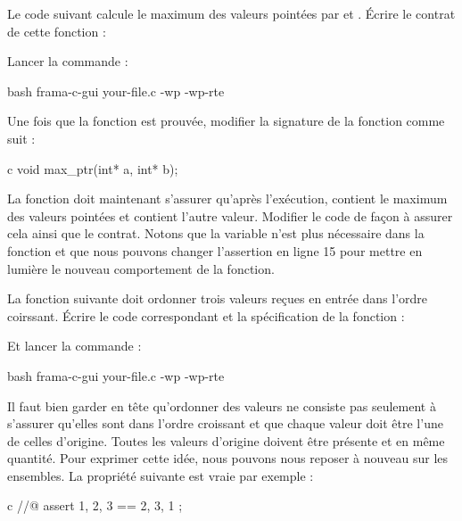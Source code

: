 

Le code suivant calcule le maximum des valeurs pointées par 
et . Écrire le contrat de cette fonction :




Lancer la commande :


\begin{CodeBlock}{bash}
frama-c-gui your-file.c -wp -wp-rte
\end{CodeBlock}


Une fois que la fonction est prouvée, modifier la signature de la
fonction comme suit :


\begin{CodeBlock}{c}
void max_ptr(int* a, int* b);
\end{CodeBlock}


La fonction doit maintenant s'assurer qu'après l'exécution, 
contient le maximum des valeurs pointées et  contient l'autre
valeur. Modifier le code de façon à assurer cela ainsi que le contrat.
Notons que la variable   n'est plus nécessaire dans la fonction
 et que nous pouvons changer l'assertion en ligne 15 pour
mettre en lumière le nouveau comportement de la fonction.




La fonction suivante doit ordonner trois valeurs reçues en entrée dans
l'ordre coirssant. Écrire le code correspondant et la spécification de la
fonction :



Et lancer la commande :


\begin{CodeBlock}{bash}
frama-c-gui your-file.c -wp -wp-rte
\end{CodeBlock}


Il faut bien garder en tête qu'ordonner des valeurs ne consiste pas seulement
à s'assurer qu'elles sont dans l'ordre croissant et que chaque valeur doit
être l'une de celles d'origine. Toutes les valeurs d'origine doivent être
présente et en même quantité. Pour exprimer cette idée, nous pouvons nous
reposer à nouveau sur les ensembles. La propriété suivante est vraie par
exemple :


\begin{CodeBlock}{c}
//@ assert { 1, 2, 3 } == { 2, 3, 1 };
\end{CodeBlock}


